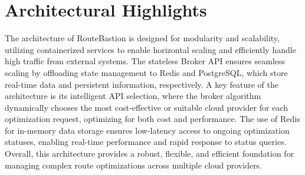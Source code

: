 \documentclass[english,notblind]{sbc20}
\begin{document}
\section{Architectural Highlights}
\label{sec:architectural_highlights}

The architecture of RouteBastion is designed for modularity and scalability, utilizing containerized services to enable horizontal scaling and efficiently handle high traffic from external systems. The stateless Broker API ensures seamless scaling by offloading state management to Redis and PostgreSQL, which store real-time data and persistent information, respectively. A key feature of the architecture is its intelligent API selection, where the broker algorithm dynamically chooses the most cost-effective or suitable cloud provider for each optimization request, optimizing for both cost and performance. The use of Redis for in-memory data storage ensures low-latency access to ongoing optimization statuses, enabling real-time performance and rapid response to status queries. Overall, this architecture provides a robust, flexible, and efficient foundation for managing complex route optimizations across multiple cloud providers.




\end{document}
